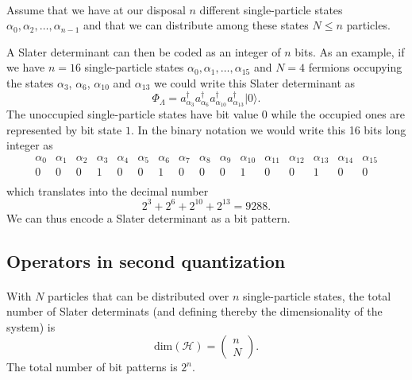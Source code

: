 \documentclass[%
oneside,                 %
final,                   %
10pt]{article}
\begin{document}
\paragraph{}
Assume that we have at our disposal $n$ different single-particle states
$\alpha_0,\alpha_2,\dots,\alpha_{n-1}$ and that we can distribute  among these states $N\le n$ particles.

A Slater  determinant can then be coded as an integer of $n$ bits. As an example, if we have $n=16$ single-particle states
$\alpha_0,\alpha_1,\dots,\alpha_{15}$ and $N=4$ fermions occupying the states $\alpha_3$, $\alpha_6$, $\alpha_{10}$ and $\alpha_{13}$
we could write this Slater determinant as  
\[
\Phi_{\Lambda} = a_{\alpha_3}^{\dagger} a_{\alpha_6}^{\dagger} a_{\alpha_{10}}^{\dagger} a_{\alpha_{13}}^{\dagger} |0\rangle.
\]
The unoccupied single-particle states have bit value $0$ while the occupied ones are represented by bit state $1$. 
In the binary notation we would write this   16 bits long integer as
\[
\begin{array}{cccccccccccccccc}
{\alpha_0}&{\alpha_1}&{\alpha_2}&{\alpha_3}&{\alpha_4}&{\alpha_5}&{\alpha_6}&{\alpha_7} & {\alpha_8} &{\alpha_9} & {\alpha_{10}} &{\alpha_{11}} &{\alpha_{12}} &{\alpha_{13}} &{\alpha_{14}} & {\alpha_{15}} \\
{0} & {0} &{0} &{1} &{0} &{0} &{1} &{0} &{0} &{0} &{1} &{0} &{0} &{1} &{0} & {0} \\
\end{array}
\]
which translates into the decimal number
\[
2^3+2^6+2^{10}+2^{13}=9288.
\]
We can thus encode a Slater determinant as a bit pattern.



\subsection*{Operators in second quantization}

\paragraph{}
With $N$ particles that can be distributed over $n$ single-particle states, the total number of Slater determinats (and defining thereby the dimensionality of the system) is
\[
\mathrm{dim}(\mathcal{H}) = \left(\begin{array}{c} n \\N\end{array}\right).
\]
The total number of bit patterns is $2^n$.
\end{document}
